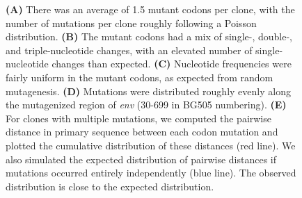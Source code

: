 \documentclass[9pt,lineno]{elife}
\begin{document}
\begin{figure}
{{\bf(A)} There was an average of 1.5 mutant codons per clone, with the number of mutations per clone roughly following a Poisson distribution. 
{\bf(B)} The mutant codons had a mix of single-, double-, and triple-nucleotide changes, with an elevated number of single-nucleotide changes than expected.
{\bf(C)} Nucleotide frequencies were fairly uniform in the mutant codons, as expected from random mutagenesis.
{\bf(D)} Mutations were distributed roughly evenly along the mutagenized region of {\it env} (30-699 in BG505 numbering).
{\bf(E)} For clones with multiple mutations, we computed the pairwise distance in primary sequence between each codon mutation and plotted the cumulative distribution of these distances (red line). 
We also simulated the expected distribution of pairwise distances if mutations occurred entirely independently (blue line). 
The observed distribution is close to the expected distribution.
}
\end{figure}
\end{document}
